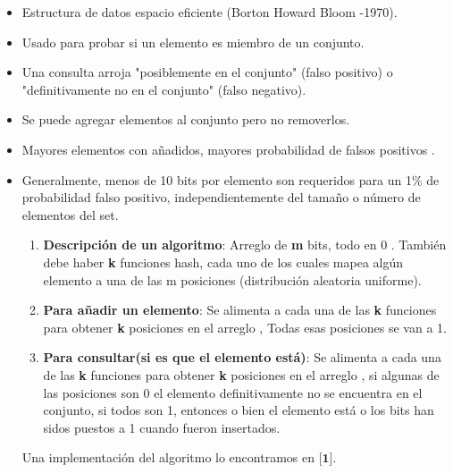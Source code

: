 \documentclass[journal]{IEEEtran}
\begin{document}
\begin{itemize}
    \item Estructura de datos espacio eficiente (Borton Howard Bloom -1970).
    \item Usado para probar si un elemento es miembro de un conjunto.
    \item Una consulta arroja "posiblemente en el conjunto" (falso positivo)  o "definitivamente no en el conjunto" (falso negativo).
    \item Se puede agregar elementos al conjunto pero no removerlos.
    \item Mayores elementos con añadidos, mayores probabilidad de falsos positivos .
    \item Generalmente, menos de 10 bits por elemento son requeridos para un 1\% de probabilidad falso positivo, independientemente del tamaño o número de elementos del set.\\
    \begin{enumerate}
    \item {\bf Descripción de un algoritmo}: Arreglo de \textbf{m} bits, todo en 0 . También debe haber \textbf{k} funciones hash, cada uno de los cuales mapea algún elemento a una de las m posiciones (distribución aleatoria uniforme). 
    \item {\bf Para añadir un elemento}: Se alimenta a cada una de las \textbf{k} funciones para obtener \textbf{k} posiciones en el arreglo , Todas esas posiciones se van a 1.
    \item {\bf Para consultar(si es que el elemento está)}: Se alimenta a cada una de las \textbf{k} funciones para obtener \textbf{k} posiciones en el arreglo , si algunas de las posiciones son 0 el elemento definitivamente no se encuentra en el conjunto, si todos son 1, entonces o bien el elemento está o los bits han sidos puestos a 1 cuando fueron insertados.
\end{enumerate}
Una implementaci\'on del algoritmo lo encontramos en $\textbf{[1]}.$



\end{itemize}
\end{document}
